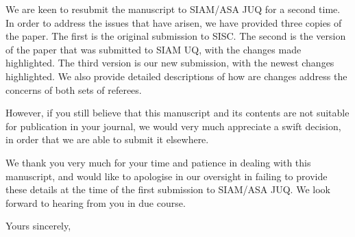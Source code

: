 \documentclass{letter}
\begin{document}
\begin{letter}{ }
We are keen to resubmit the manuscript to SIAM/ASA JUQ for a second time. In order to address the issues that have arisen, we have provided three copies of the paper. The first is the original submission to SISC. The second is the version of the paper that was submitted to SIAM UQ, with the changes made highlighted. The third version is our new submission, with the newest changes highlighted. We also provide detailed descriptions of how are changes address the concerns of both sets of referees.

However, if you still believe that this manuscript and its contents are not suitable for publication in your journal, we would very much appreciate a swift decision, in order that we are able to submit it elsewhere.

We thank you very much for your time and patience in dealing with this manuscript, and would like to apologise in our oversight in failing to provide these details at the time of the first submission to SIAM/ASA JUQ. We look forward to hearing from you in due course.

\closing{Yours sincerely,}
\end{letter}
\end{document}
